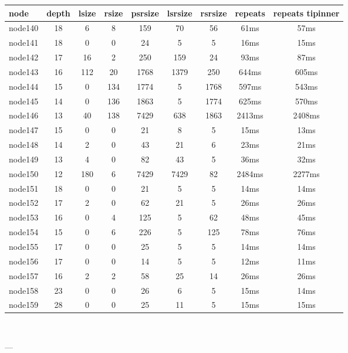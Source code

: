 \begin{tabular}{|l|c|c|c|c|c|c|c|c|}
\hline node & depth & lsize & rsize & psrsize & lsrsize & rsrsize   & repeats & repeats tipinner\\
    \hline node140 & 18 & 6 & 8 & 159 & 70 & 56 & 61ms & 57ms\\
    \hline node141 & 18 & 0 & 0 & 24 & 5 & 5 & 16ms & 15ms\\
    \hline node142 & 17 & 16 & 2 & 250 & 159 & 24 & 93ms & 87ms\\
    \hline node143 & 16 & 112 & 20 & 1768 & 1379 & 250 & 644ms & 605ms\\
    \hline node144 & 15 & 0 & 134 & 1774 & 5 & 1768 & 597ms & 543ms\\
    \hline node145 & 14 & 0 & 136 & 1863 & 5 & 1774 & 625ms & 570ms\\
    \hline node146 & 13 & 40 & 138 & 7429 & 638 & 1863 & 2413ms & 2408ms\\
    \hline node147 & 15 & 0 & 0 & 21 & 8 & 5 & 15ms & 13ms\\
    \hline node148 & 14 & 2 & 0 & 43 & 21 & 6 & 23ms & 21ms\\
    \hline node149 & 13 & 4 & 0 & 82 & 43 & 5 & 36ms & 32ms\\
    \hline node150 & 12 & 180 & 6 & 7429 & 7429 & 82 & 2484ms & 2277ms\\
    \hline node151 & 18 & 0 & 0 & 21 & 5 & 5 & 14ms & 14ms\\
    \hline node152 & 17 & 2 & 0 & 62 & 21 & 5 & 26ms & 26ms\\
    \hline node153 & 16 & 0 & 4 & 125 & 5 & 62 & 48ms & 45ms\\
    \hline node154 & 15 & 0 & 6 & 226 & 5 & 125 & 78ms & 76ms\\
    \hline node155 & 17 & 0 & 0 & 25 & 5 & 5 & 14ms & 14ms\\
    \hline node156 & 17 & 0 & 0 & 14 & 5 & 5 & 12ms & 11ms\\
    \hline node157 & 16 & 2 & 2 & 58 & 25 & 14 & 26ms & 26ms\\
    \hline node158 & 23 & 0 & 0 & 26 & 6 & 5 & 15ms & 14ms\\
    \hline node159 & 28 & 0 & 0 & 25 & 11 & 5 & 15ms & 15ms\\

\hline
\end{tabular} \

---


